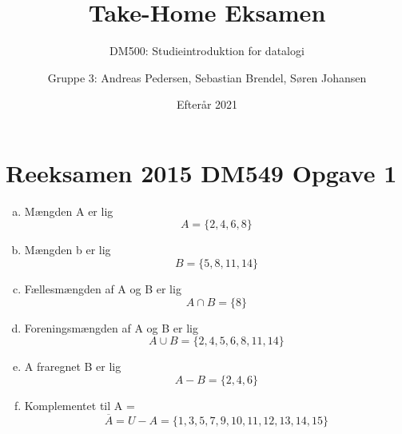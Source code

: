 \documentclass[a4paper, oneside]{scrartcl}
\title{Take-Home Eksamen}
\subtitle{DM500: Studieintroduktion for datalogi}
\date{Efterår 2021}
\author{Gruppe 3: Andreas Pedersen, Sebastian Brendel, Søren Johansen}
\begin{document}
\maketitle  
\section*{Reeksamen 2015 DM549 Opgave 1}
\begin{enumerate}[a)]
\item Mængden A er lig \[A = \{2, 4, 6, 8\}\]

\item Mængden b er lig \[B = \{5, 8, 11, 14\}\]

\item Fællesmængden af A og B er lig \[A \cap B = \{8\}\]

\item Foreningsmængden af A og B er lig \[A \cup B = \{2, 4, 5, 6, 8, 11, 14\}\]

\item A fraregnet B er lig \[A - B = \{2, 4, 6\}\]

\item Komplementet til A = \[\overline{A} = U - A = \{1, 3, 5, 7, 9, 10, 11,12, 13, 14, 15\}\]
\end{enumerate}
\end{document}
